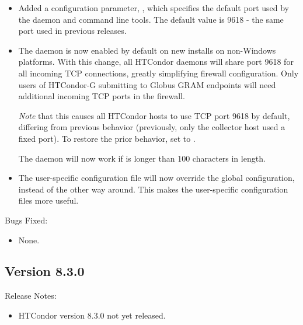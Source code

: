\begin{itemize}

\item Added a configuration parameter, , which specifies
the default port used by the  daemon and command line tools.
The default value is 9618 - the same port used in previous releases.

\item The  daemon is now enabled by default on new installs on
non-Windows platforms.
With this change, all HTCondor daemons will share port 9618 for all incoming TCP
connections, greatly simplifying firewall configuration.  Only users of HTCondor-G
submitting to Globus GRAM endpoints will need additional incoming TCP ports in
the firewall.

\emph{Note} that this causes all HTCondor hosts to use TCP port 9618 by default,
differing from previous behavior (previously, only the collector host used a 
fixed port).  To restore the prior behavior, set  to .

The  daemon will now work if  is
longer than 100 characters in length.

\item The user-specific configuration file  will
now override the global configuration, instead of the other way around.  This
makes the user-specific configuration files more useful.

\end{itemize}

\noindent Bugs Fixed:

\begin{itemize}

\item None.

\end{itemize}

\subsection*{\label{sec:New-8-3-0}Version 8.3.0}

\noindent Release Notes:

\begin{itemize}

\item HTCondor version 8.3.0 not yet released.

\end{itemize}


